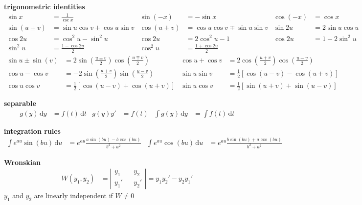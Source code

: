 \documentclass{article}
\newcommand{\abs}[1]{\left\lvert #1 \right\rvert}
\begin{document}
\noindent
\textbf{trigonometric identities}
\begin{align*}
	\sin x&=\frac{1}{\csc x} & \sin(-x)&=-\sin x & \cos(-x)&=\cos x\\
	\sin(u\pm v)&=\sin u \cos v \pm \cos u \sin v & \cos(u \pm v)&=\cos u \cos v \mp \sin u \sin v & \sin 2u&=2\sin u \cos u\\
	\cos 2u&=\cos^2 u - \sin^2 u & \cos 2u&=2\cos^2 u - 1 & \cos 2u&=1 - 2\sin^2 u\\
	\sin^2 u&=\frac{1-\cos 2u}{2} & \cos^2 u&=\frac{1+\cos 2u}{2}
\end{align*}
\begin{align*}
	\sin u \pm \sin(v)&=2\sin\left(\frac{u\pm v}{2}\right)\cos\left(\frac{u \mp v}{2}\right) & \cos u + \cos v&=2\cos\left(\frac{u + v}{2}\right)\cos\left(\frac{u - v}{2}\right)\\
	\cos u - \cos v&=-2\sin\left(\frac{u + v}{2}\right)\sin\left(\frac{u - v}{2}\right) & \sin u\sin v&=\frac{1}{2}[\cos(u-v)-\cos(u+v)]\\
	\cos u\cos v&=\frac{1}{2}[\cos(u-v)+\cos(u+v)] & \sin u\cos v&=\frac{1}{2}[\sin(u+v)+\sin(u-v)]
\end{align*}

\noindent
\textbf{separable}
\begin{align*}
g(y)\,\mathrm{d}y&=f(t)\,\mathrm{d}t & g(y)y'&=f(t) & \int{g(y)\,\mathrm{d}y}&=\int{f(t)\,\mathrm{d}t}
\end{align*}

\noindent
\textbf{integration rules}
\begin{align*}
	\int{e^{au}\sin(bu)\,\mathrm{d}u}&=e^{au}\frac{a\sin(bu)-b\cos(bu)}{b^2+a^2} &
	\int{e^{au}\cos(bu)\,\mathrm{d}u}&=e^{au}\frac{b\sin(bu)+a\cos(bu)}{b^2+a^2}
\end{align*}

\noindent
\textbf{Wronskian}
\begin{align*}
	W(y_1,y_2)&=\abs{
	\begin{aligned}
	y_1&&y_2\\
	y_1'&&y_2'
	\end{aligned}
	}=y_1y_2'-y_2y_1'
\end{align*}
$y_1$ and $y_2$ are linearly independent if $W\neq0$
\end{document}
